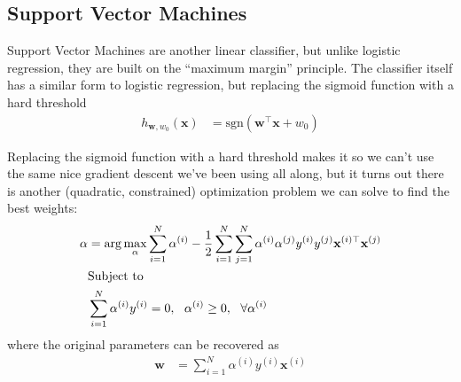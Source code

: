 \documentclass{article}
\begin{document}
\subsection*{Support Vector Machines}

Support Vector Machines are another linear classifier, but unlike logistic regression, they are built on the ``maximum margin'' principle. The classifier itself has a similar form to logistic regression, but replacing the sigmoid function with a hard threshold
\begin{align}
	h_{\mathbf{w},w_0}(\mathbf{x}) &= \text{sgn}(\mathbf{w}^\top\mathbf{x}+w_0)
\end{align}

Replacing the sigmoid function with a hard threshold makes it so we can't use the same nice gradient descent we've been using all along, but it turns out there is another (quadratic, constrained) optimization problem we can solve to find the best weights:
\begin{align}
	\alpha &= \arg\max_\alpha \sum_{i=1}^N \alpha^{(i)} - \frac{1}{2} \sum_{i=1}^N\sum_{j=1}^N \alpha^{(i)} \alpha^{(j)} y^{(i)} y^{(j)} \mathbf{x}^{(i)\top} \mathbf{x}^{(j)}\\
	&\text{Subject to} \notag\\
	&\sum_{i=1}^N\alpha^{(i)} y^{(i)} = 0, ~~\alpha^{(i)}\geq 0, ~~\forall\alpha^{(i)}\notag
\end{align}
where the original parameters can be recovered as
\begin{align}
	\mathbf{w} &= \sum_{i=1}^{N} \alpha^{(i)} y^{(i)} \mathbf{x}^{(i)}
\end{align}
\end{document}
